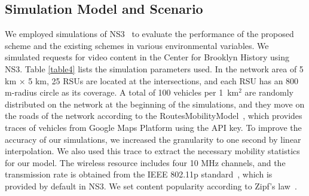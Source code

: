 \documentclass[electronics,aricle,accept,pdftex,moreauthors]{Definitions/mdpi}
\begin{document}
\subsection{Simulation Model and Scenario} \label{sesc5.1}
We employed simulations of NS3~\cite{NS3} to evaluate the performance of the proposed scheme and the existing schemes in various environmental variables. We simulated requests for video content in the Center for Brooklyn History using NS3. %
Table \ref{table4} lists the simulation parameters used. In the network area of 5 km × 5 km, 25 RSUs are located at the intersections, and each RSU has an 800 m-radius circle as its coverage. A total of 100 vehicles per 1~{km}$^{2}$ are randomly distributed on the network at the beginning of the simulations, and they move on the roads of the network according to the RoutesMobilityModel~\cite{RoutesModel}, which provides traces of vehicles from Google Maps Platform using the API key. To improve the accuracy of our simulations, we increased the granularity to one second by linear interpolation. We also used this trace to extract the necessary mobility statistics for our model. The wireless resource includes four 10 MHz channels, and the transmission rate is obtained from the IEEE 802.11p standard~\cite{WAVE}, which is provided by default in NS3. We set content popularity according to Zipf’s law~\cite{Zipf}.
\end{document}
